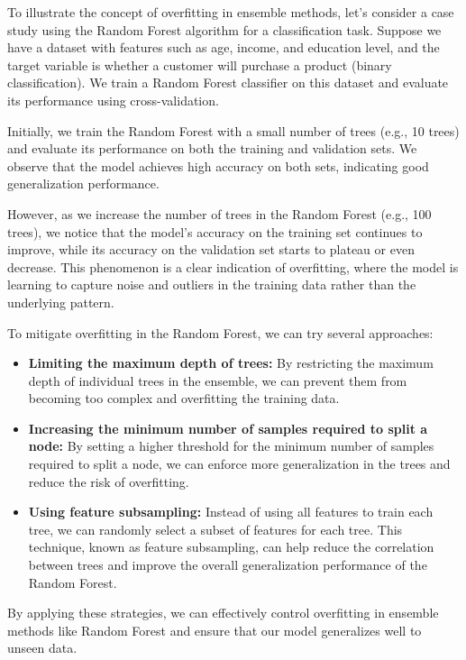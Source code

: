 \documentclass[12pt]{book} %
\begin{document}
To illustrate the concept of overfitting in ensemble methods, let's consider a case study using the Random Forest algorithm for a classification task. Suppose we have a dataset with features such as age, income, and education level, and the target variable is whether a customer will purchase a product (binary classification). We train a Random Forest classifier on this dataset and evaluate its performance using cross-validation.

Initially, we train the Random Forest with a small number of trees (e.g., 10 trees) and evaluate its performance on both the training and validation sets. We observe that the model achieves high accuracy on both sets, indicating good generalization performance.

However, as we increase the number of trees in the Random Forest (e.g., 100 trees), we notice that the model's accuracy on the training set continues to improve, while its accuracy on the validation set starts to plateau or even decrease. This phenomenon is a clear indication of overfitting, where the model is learning to capture noise and outliers in the training data rather than the underlying pattern.

To mitigate overfitting in the Random Forest, we can try several approaches:

\begin{itemize}
    \item \textbf{Limiting the maximum depth of trees:} By restricting the maximum depth of individual trees in the ensemble, we can prevent them from becoming too complex and overfitting the training data.
    \item \textbf{Increasing the minimum number of samples required to split a node:} By setting a higher threshold for the minimum number of samples required to split a node, we can enforce more generalization in the trees and reduce the risk of overfitting.
    \item \textbf{Using feature subsampling:} Instead of using all features to train each tree, we can randomly select a subset of features for each tree. This technique, known as feature subsampling, can help reduce the correlation between trees and improve the overall generalization performance of the Random Forest.
\end{itemize}

By applying these strategies, we can effectively control overfitting in ensemble methods like Random Forest and ensure that our model generalizes well to unseen data.
\end{document}
